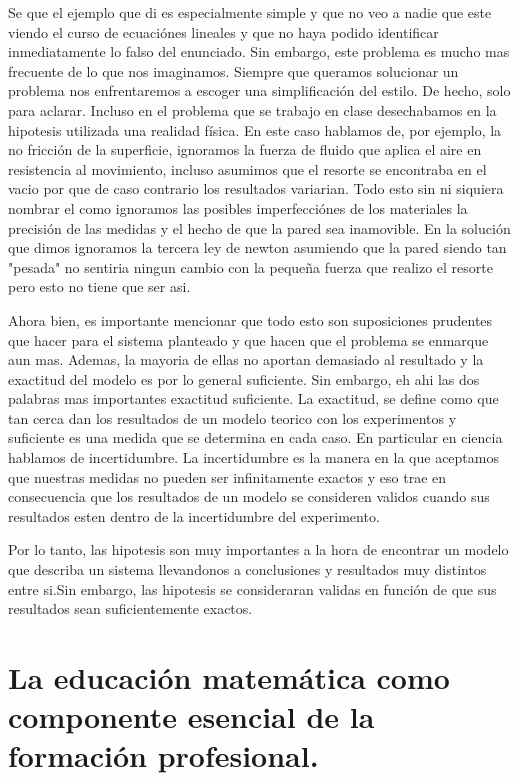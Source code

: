 \documentclass{report}
\begin{document}
Se que el ejemplo que di es especialmente simple y que no veo a nadie que este viendo el curso de ecuaciónes lineales y que no haya podido identificar inmediatamente lo falso del enunciado. Sin embargo, este problema es mucho mas frecuente de lo que nos imaginamos. Siempre que queramos solucionar un problema nos enfrentaremos a escoger una simplificación del estilo. De hecho, solo para aclarar. Incluso en el problema que se trabajo en clase desechabamos en la hipotesis utilizada una realidad física. En este caso hablamos de, por ejemplo, la no fricción de la superficie, ignoramos la fuerza de fluido que aplica el aire en resistencia al movimiento, incluso asumimos que el resorte se encontraba en el vacio por que de caso contrario los resultados variarian. Todo esto sin ni siquiera nombrar el como ignoramos las posibles imperfecciónes de los materiales la precisión de las medidas y el hecho de que la pared sea inamovible. En la solución que dimos ignoramos la tercera ley de newton asumiendo que la pared siendo tan "pesada" no sentiria ningun cambio con la pequeña fuerza que realizo el resorte pero esto no tiene que ser asi. 

Ahora bien, es importante mencionar que todo esto son suposiciones prudentes que hacer para el sistema planteado y que hacen que el problema se enmarque aun mas. Ademas, la mayoria de ellas no aportan demasiado al resultado y la exactitud del modelo es por lo general suficiente. Sin embargo, eh ahi las dos palabras mas importantes exactitud suficiente. La exactitud, se define como que tan cerca dan los resultados de un modelo teorico con los experimentos y suficiente es una medida que se determina en cada caso. En particular en ciencia hablamos de incertidumbre. La incertidumbre es la manera en la que aceptamos que nuestras medidas no pueden ser infinitamente exactos y eso trae en consecuencia que los resultados de un modelo se consideren validos cuando sus resultados esten dentro de la incertidumbre del experimento.

Por lo tanto, las hipotesis son muy importantes a la hora de encontrar un modelo que describa un sistema llevandonos a conclusiones y resultados muy distintos entre si.Sin embargo, las hipotesis se consideraran validas en función de que sus resultados sean suficientemente exactos. 

\chapter{La educación matemática como componente esencial de la formación profesional.}
\end{document}
